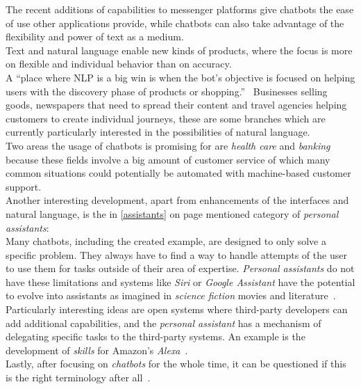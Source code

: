 The recent additions of capabilities to messenger platforms give chatbots the ease of use other applications provide,
while chatbots can also take advantage of the flexibility and power of text as a medium.
\\

Text and natural language enable new kinds of products, where the focus is more on flexible and individual behavior than on accuracy.
\\
A ``place where NLP is a big win is when the bot’s objective is focused on helping users with the discovery phase of products or shopping.''~\cite{neednlp}
Businesses selling goods, newspapers that need to spread their content and travel agencies helping customers to create individual journeys,
these are some branches which are currently particularly interested in the possibilities of natural language.
\\
Two areas the usage of chatbots is promising for are \emph{health care} and \emph{banking}~\cite{botlist}
because these fields involve a big amount of customer service of which many common situations could potentially be automated with machine-based customer support.
\\

Another interesting development, apart from enhancements of the interfaces and natural language, is the in \ref{assistants} on page \pageref{assistants} mentioned category of \emph{personal assistants}:
\\

Many chatbots, including the created example, are designed to only solve a specific problem.
They always have to find a way to handle attempts of the user to use them for tasks outside of their area of expertise.
\emph{Personal assistants} do not have these limitations
and systems like \emph{Siri} or \emph{Google Assistant} have the potential to evolve into assistants as imagined in \emph{science fiction} movies and literature~\cite{assistant}.
\\

Particularly interesting ideas are open systems where third-party developers can add additional capabilities,
and the \emph{personal assistant} has a mechanism of delegating specific tasks to the third-party systems.
An example is the development of \emph{skills} for Amazon's \emph{Alexa}~\cite{alexa}.
\\

Lastly, after focusing on \emph{chatbots} for the whole time,
it can be questioned if this is the right terminology after all~\cite{botnerds}.

